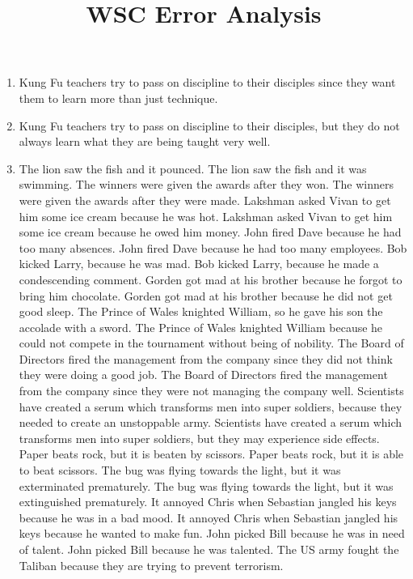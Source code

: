 \documentclass{article}
\begin{document}
\title{WSC Error Analysis}
\maketitle


\begin{enumerate}
\item Kung Fu teachers try to pass on discipline to their disciples since they want them to learn more than just technique.
\item Kung Fu teachers try to pass on discipline to their disciples, but they do not always learn what they are being taught very well.
\item The lion saw the fish and it pounced.
The lion saw the fish and it was swimming.
The winners were given the awards after they won.
The winners were given the awards after they were made.
Lakshman asked Vivan to get him some ice cream because he was hot.
Lakshman asked Vivan to get him some ice cream because he owed him money.
John fired Dave because he had too many absences.
John fired Dave because he had too many employees.
Bob kicked Larry, because he was mad.
Bob kicked Larry, because he made a condescending comment.
Gorden got mad at his brother because he forgot to bring him chocolate.
Gorden got mad at his brother because he did not get good sleep.
The Prince of Wales knighted William, so he gave his son the accolade with a sword.
The Prince of Wales knighted William because he could not compete in the tournament without being of nobility.
The Board of Directors fired the management from the company since they did not think they were doing a good job.
The Board of Directors fired the management from the company since they were not managing the company well.
Scientists have created a serum which transforms men into super soldiers, because they needed to create an unstoppable army.
Scientists have created a serum which transforms men into super soldiers, but they may experience side effects.
Paper beats rock, but it is beaten by scissors.
Paper beats rock, but it is able to beat scissors.
The bug was flying towards the light, but it was exterminated prematurely.
The bug was flying towards the light, but it was extinguished prematurely.
It annoyed Chris when Sebastian jangled his keys because he was in a bad mood.
It annoyed Chris when Sebastian jangled his keys because he wanted to make fun.
John picked Bill because he was in need of talent.
John picked Bill because he was talented.
The US army fought the Taliban because they are trying to prevent terrorism.

\end{enumerate}
\end{document}
